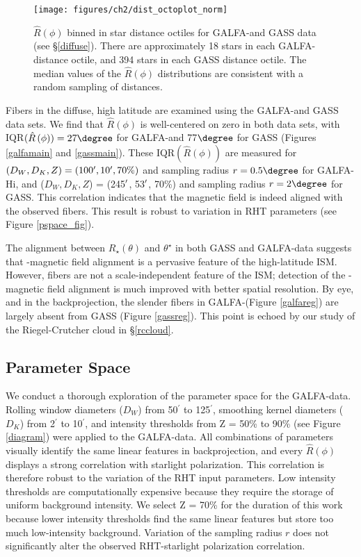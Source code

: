\begin{figure*}[h!]
\centering
\texttt{[image: figures/ch2/dist\_octoplot\_norm]}
\caption{${\hat{R}\left(\phi\right)}$ binned in star distance octiles for GALFA-\hi and GASS data (see \S \ref{diffuse}). There are approximately 18 stars in each GALFA-\hi distance octile, and 394 stars in each GASS distance octile. The median values of the $\hat{R}\left(\phi\right)$ distributions are consistent with a random sampling of distances.}
\label{octoplot}
\end{figure*}

Fibers in the diffuse, high latitude \hi are examined using the GALFA-\hi and GASS data sets. We find that $\hat{R}\left(\phi\right)$ is well-centered on zero in both data sets, with IQR$(\hat{R}\left(\phi\right)) = 27\degree$ for GALFA-\hi and 77$\degree$ for GASS (Figures \ref{galfamain} and \ref{gassmain}). 
These IQR$(\hat{R}\left(\phi\right))$ are measured for $(D_W, D_K, Z) = (100\mbox{$^\prime$}, 10\mbox{$^\prime$}, 70\%)$ and sampling radius $r = 0.5\degree$ for GALFA-H{\sc i}, and ($D_W, D_K, Z$) = (245$\mbox{$^\prime$}$, 53$\mbox{$^\prime$}$, 70\%) and sampling radius $r = 2\degree$ for GASS. This correlation indicates that the magnetic field is indeed aligned with the observed fibers. This result is robust to variation in RHT parameters (see Figure \ref{pspace_fig}). 

The alignment between $R_\star\left(\theta\right)$ and $\theta^\star$ in both GASS and GALFA-\hi data suggests that \hia-magnetic field alignment is a pervasive feature of the high-latitude ISM. However, fibers are not a scale-independent feature of the ISM; detection of the \hia-magnetic field alignment is much improved with better spatial resolution. By eye, and in the backprojection, the slender fibers in GALFA-\hi (Figure \ref{galfareg}) are largely absent from GASS (Figure \ref{gassreg}). This point is echoed by our study of the Riegel-Crutcher cloud in \S\ref{rccloud}.

\subsection{Parameter Space}\label{fiberparamspace}

We conduct a thorough exploration of the parameter space for the GALFA-\hi data. Rolling window diameters ($D_W$) from 50$^\prime$ to 125$^\prime$, smoothing kernel diameters ($D_K$) from 2$^\prime$ to 10$^\prime$, and intensity thresholds from Z = 50\% to 90\% (see Figure \ref{diagram}) were applied to the GALFA-\hi data. All combinations of parameters visually identify the same linear features in backprojection, and every $\hat{R}\left(\phi\right)$ displays a strong correlation with starlight polarization. This correlation is therefore robust to the variation of the RHT input parameters. Low intensity thresholds are computationally expensive because they require the storage of uniform background intensity. We select Z = 70\% for the duration of this work because lower intensity thresholds find the same linear features but store too much low-intensity background. Variation of the sampling radius $r$ does not significantly alter the observed RHT-starlight polarization correlation.

